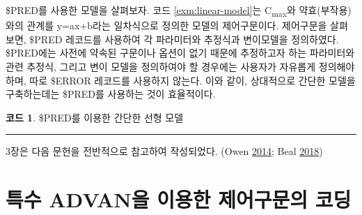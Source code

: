 \documentclass[
  11pt,
  krantz2, a4paper, twoside]{krantz}
\newenvironment{Shaded}{\begin{snugshade}}{\end{snugshade}}
\newcommand{\DataTypeTok}[1]{\textcolor[rgb]{0.13,0.29,0.53}{#1}}
\newcommand{\DecValTok}[1]{\textcolor[rgb]{0.00,0.00,0.81}{#1}}
\newcommand{\FloatTok}[1]{\textcolor[rgb]{0.00,0.00,0.81}{#1}}
\newcommand{\NormalTok}[1]{#1}
\theoremstyle{definition}
\theoremstyle{definition}
\newtheorem{example}{코드}[chapter]
\theoremstyle{definition}
\theoremstyle{remark}
\begin{document}

\$PRED를 사용한 모델을 살펴보자. 코드 \ref{exm:linear-model}는 C\textsubscript{max}와 약효(부작용)와의 관계를 y=ax+b라는 일차식으로 정의한 모델의 제어구문이다. 제어구문을 살펴보면, \$PRED 레코드를 사용하여 각 파라미터와 추정식과 변이모델을 정의하였다. \$PRED에는 사전에 약속된 구문이나 옵션이 없기 때문에 추정하고자 하는 파라미터와 관련 추정식, 그리고 변이 모델을 정의하여야 할 경우에는 사용자가 자유롭게 정의해야 하며, 따로 \$ERROR 레코드를 사용하지 않는다. 이와 같이, 상대적으로 간단한 모델을 구축하는데는 \$PRED를 사용하는 것이 효율적이다.

\begin{example}
\protect\hypertarget{exm:linear-model}{}{\label{exm:linear-model} }\$PRED를 이용한 간단한 선형 모델
\end{example}
\vspace{-5ex}

\begin{Shaded}
\end{Shaded}

\begin{center}\rule{0.5\linewidth}{0.5pt}\end{center}

3장은 다음 문헌을 전반적으로 참고하여 작성되었다. (Owen \protect\hyperlink{ref-kelly}{2014}; Beal \protect\hyperlink{ref-nonmem}{2018})

\hypertarget{specific-advan}{%
\chapter{특수 ADVAN을 이용한 제어구문의 코딩}\label{specific-advan}}
\end{document}
